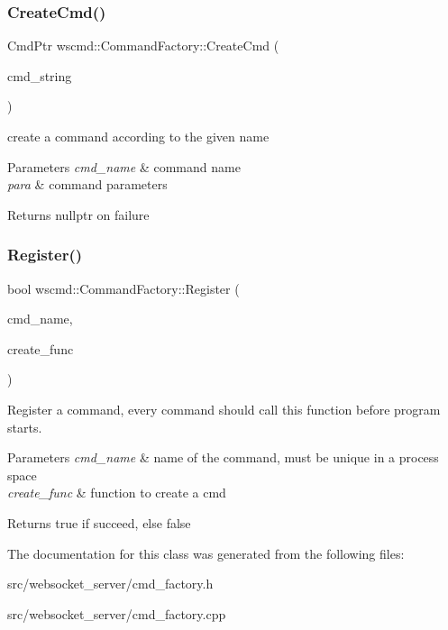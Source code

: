 \subsubsection{\texorpdfstring{Create\+Cmd()}{CreateCmd()}}
{\footnotesize\ttfamily Cmd\+Ptr wscmd\+::\+Command\+Factory\+::\+Create\+Cmd (\begin{DoxyParamCaption}\item[{const string \&}]{cmd\+\_\+string }\end{DoxyParamCaption})\hspace{0.3cm}{\ttfamily [static]}}



create a command according to the given {\ttfamily name} 


\begin{DoxyParams}{Parameters}
{\em cmd\+\_\+name} & command name \\
\hline
{\em para} & command parameters\\
\hline
\end{DoxyParams}
\begin{DoxyReturn}{Returns}
nullptr on failure 
\end{DoxyReturn}
\mbox{\label{classwscmd_1_1CommandFactory_a3d750b11a80519e15f7e2efbc1f60528}} 
\subsubsection{\texorpdfstring{Register()}{Register()}}
{\footnotesize\ttfamily bool wscmd\+::\+Command\+Factory\+::\+Register (\begin{DoxyParamCaption}\item[{const string \&}]{cmd\+\_\+name,  }\item[{Create\+Function \&\&}]{create\+\_\+func }\end{DoxyParamCaption})\hspace{0.3cm}{\ttfamily [static]}}



Register a command, every command should call this function before program starts. 


\begin{DoxyParams}{Parameters}
{\em cmd\+\_\+name} & name of the command, must be unique in a process space \\
\hline
{\em create\+\_\+func} & function to create a cmd \\
\hline
\end{DoxyParams}
\begin{DoxyReturn}{Returns}
true if succeed, else false 
\end{DoxyReturn}


The documentation for this class was generated from the following files\+:\begin{DoxyCompactItemize}
\item 
src/websocket\+\_\+server/cmd\+\_\+factory.\+h\item 
src/websocket\+\_\+server/cmd\+\_\+factory.\+cpp\end{DoxyCompactItemize}
